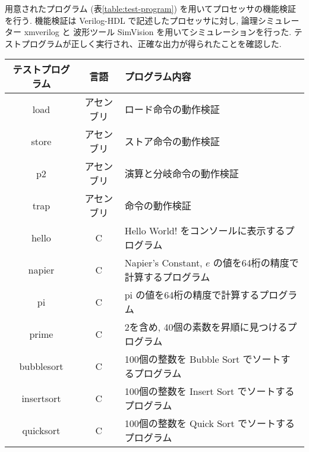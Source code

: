 \documentclass[../main.tex]{subfiles}
\begin{document}
  用意されたプログラム (表\ref{table:test-program}) を用いてプロセッサの機能検証を行う.
  機能検証は Verilog-HDL で記述したプロセッサに対し, 
  論理シミュレーター xmverilog と
  波形ツール SimVision を用いてシミュレーションを行った.
  テストプログラムが正しく実行され、正確な出力が得られたことを確認した.

  \begin{table*}[t]
    \centering
    \begin{tabular}{|c|c|l|}
    \hline
    テストプログラム & 言語 & プログラム内容 \\ \hline
    load & アセンブリ & ロード命令の動作検証 \\
    store & アセンブリ & ストア命令の動作検証 \\
    p2 & アセンブリ & 演算と分岐命令の動作検証 \\
    trap & アセンブリ & 命令の動作検証 \\
    hello & C & Hello World! をコンソールに表示するプログラム \\
    napier & C & Napier's Constant, $e$ の値を64桁の精度で計算するプログラム \\
    pi & C & pi の値を64桁の精度で計算するプログラム \\
    prime & C & 2を含め, 40個の素数を昇順に見つけるプログラム \\
    bubblesort & C & 100個の整数を Bubble Sort でソートするプログラム \\
    insertsort & C & 100個の整数を Insert Sort でソートするプログラム \\
    quicksort & C & 100個の整数を Quick Sort でソートするプログラム \\ \hline
    \end{tabular}
    \caption{機能検証用プログラム}
    \label{table:test-program}
  \end{table*}
\end{document}
